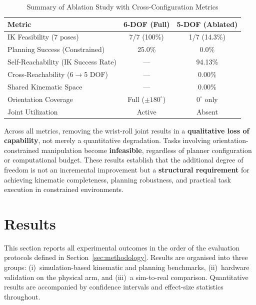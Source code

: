 \documentclass[conference]{IEEEtran}
\begin{document}
	\begin{table}[t]
		\centering
		\caption{Summary of Ablation Study with Cross-Configuration Metrics}
		\label{tab:ablation_summary}
		\begin{tabular}{l|c|c}
			\hline
			\textbf{Metric} & \textbf{6-DOF (Full)} & \textbf{5-DOF (Ablated)} \\
			\hline
			IK Feasibility (7 poses)                  & 7/7 (100\%)     & 1/7 (14.3\%)    \\
			Planning Success (Constrained)            & 25.0\%          & 0.0\%           \\
			Self-Reachability (IK Success Rate)       & ---             & 94.13\%         \\
			Cross-Reachability (6$\rightarrow$5 DOF)  & ---             & 0.00\%          \\
			Shared Kinematic Space                    & ---             & 0.00\%          \\
			Orientation Coverage                      & Full ($\pm180^\circ$) & $0^\circ$ only \\
			Joint Utilization                         & Active          & Absent          \\
			\hline
		\end{tabular}
	\end{table}
	
	Across all metrics, removing the wrist-roll joint results in a
	\textbf{qualitative loss of capability}, not merely a quantitative
	degradation. Tasks involving orientation-constrained manipulation
	become \textbf{infeasible}, regardless of planner configuration or
	computational budget. These results establish that the additional
	degree of freedom is not an incremental improvement but a
	\textbf{structural requirement} for achieving kinematic completeness,
	planning robustness, and practical task execution in constrained
	environments.
	
	
	\section{Results}
	\label{sec:results}
	
	This section reports all experimental outcomes in the order of the
	evaluation protocols defined in Section~\ref{sec:methodology}.
	Results are organised into three groups: (i)~simulation-based
	kinematic and planning benchmarks, (ii)~hardware validation on the
	physical arm, and (iii)~a sim-to-real comparison. Quantitative
	results are accompanied by confidence intervals and effect-size
	statistics throughout.
	
\end{document}
